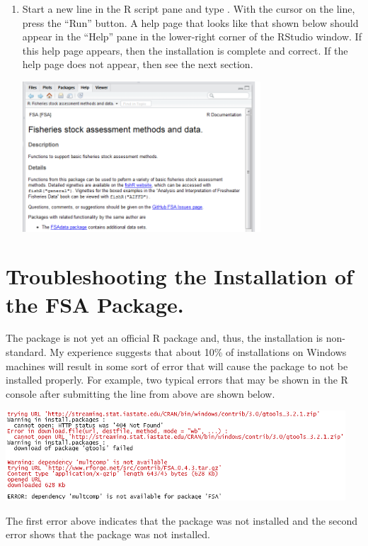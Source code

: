 \documentclass{article}\usepackage[]{graphicx}\usepackage[]{color}
\begin{document}
\begin{enumerate}
  \item Start a new line in the R script pane and type .  With the cursor on the line, press the ``Run'' button.  A help page that looks like that shown below should appear in the ``Help'' pane in the lower-right corner of the RStudio window.  If this help page appears, then the installation is complete and correct.  If the help page does not appear, then see the next section.
\begin{center}
  \includegraphics[width=3.5in]{Figs/RStudio_Prep_FSAHelp.png}
\end{center}
\end{enumerate}

\newpage
\section{Troubleshooting the Installation of the FSA Package.} \label{sect:Troubleshoot}
The  package is not yet an official R package and, thus, the installation is non-standard.  My experience suggests that about 10\% of installations on Windows machines will result in some sort of error that will cause the  package to not be installed properly.  For example, two typical errors that may be shown in the R console after submitting the  line from above are shown below.

\begin{center}
  \includegraphics[width=5in]{Figs/RStudio_Prep_FSAInstallErrors.png}
\end{center}

\noindent The first error above indicates that the  package was not installed and the second error shows that the  package was not installed.
\end{document}
